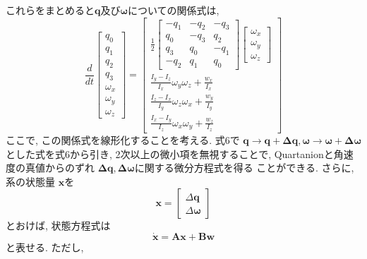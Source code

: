 \documentclass[class=article, crop=false, dvipdfmx, fleqn]{standalone}
\begin{document}
これらをまとめると$\bm{q}$及び$\bm{\omega}$についての関係式は,
\begin{equation}
  \frac{d}{dt}
  \begin{bmatrix}
    q_0 \\
    q_1 \\
    q_2 \\
    q_3 \\
    \omega_x \\
    \omega_y \\
    \omega_z
  \end{bmatrix}
  =
  \begin{bmatrix}
    \frac{1}{2}
    \begin{bmatrix}
      -q_1 & -q_2 & -q_3 \\
      q_0 & -q_3 & q_2 \\
      q_3 & q_0 & -q_1 \\
      -q_2 & q_1 & q_0
    \end{bmatrix}
    \begin{bmatrix}
      \omega_x \\
      \omega_y \\
      \omega_z
    \end{bmatrix} \\
    \displaystyle \frac{I_y - I_z}{I_x}\omega_y\omega_z + \displaystyle \frac{w_x}{I_x} \\
    \displaystyle \frac{I_z - I_x}{I_y}\omega_z\omega_x + \displaystyle \frac{w_y}{I_y} \\
    \displaystyle \frac{I_x - I_y}{I_z}\omega_x\omega_y + \displaystyle \frac{w_z}{I_z}
  \end{bmatrix}
\end{equation}
ここで, この関係式を線形化することを考える. 式6で
$\bm{q} \to \bm{q} + \bm{\Delta q}, \bm{\omega} \to \bm{\omega} + \bm{\Delta \omega}$
とした式を式6から引き, 2次以上の微小項を無視することで,
Quartanionと角速度の真値からのずれ $\bm{\Delta q}, \bm{\Delta \omega}$に関する微分方程式を得る
ことができる.
さらに, 系の状態量 $\bm{x}$を
\begin{equation}
  \bm{x} =
  \begin{bmatrix}
    \Delta \bm{q} \\
    \Delta \bm{\omega}
  \end{bmatrix}
\end{equation}
とおけば, 状態方程式は
\begin{equation}
  \dot{\bm{x}} = \bm{A}\bm{x} + \bm{B}\bm{w}
\end{equation}
と表せる. ただし,
\end{document}
